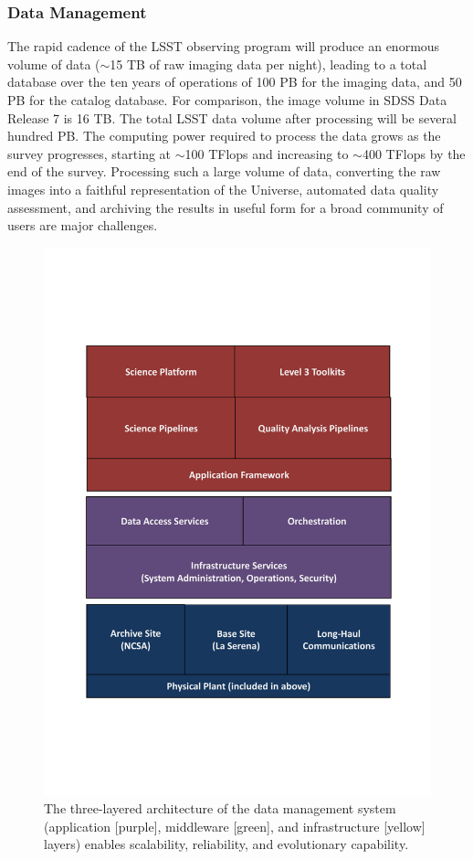 \documentclass{emulateapj}
\begin{document}
\vskip 0.2in
\subsubsection{ Data Management }


The rapid cadence of the LSST observing program will produce an enormous
volume of data ($\sim$15 TB of raw imaging data per night), leading to a total database over 
the ten years of operations of 100 PB for the imaging data, and 50 PB for the catalog database. 
For comparison, the image volume in SDSS Data Release 7 is 16 TB. 
The total LSST data volume after processing will be several hundred PB.
The computing power required to process the data grows as the survey
progresses, starting at
 $\sim$100 TFlops and increasing to $\sim$400 TFlops by the end of the survey. Processing 
such a large volume of data, converting the raw images into a faithful
representation of the Universe, automated data quality assessment, and 
archiving the results in useful form for a broad community of users are
major challenges.

\begin{figure}
\vskip 0.1in
\includegraphics[width=1.0\hsize,clip]{DMsandwich.pdf}
\caption{The three-layered architecture of the data management system 
(application [purple], middleware [green], and infrastructure [yellow] layers) 
enables scalability, reliability, and evolutionary capability.} 
\label{Fig:DM1}
\end{figure}
\end{document}

